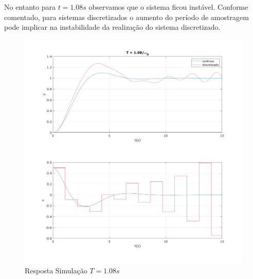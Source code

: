\documentclass[a4paper,11pt]{article}
\begin{document}
No entanto para $t=1.08s$ observamos que o sistema ficou instável. Conforme comentado, para sistemas discretizados o aumento do período de amostragem pode implicar na instabilidade da realização do sistema discretizado.

\begin{figure}[H]
    \centering
    \includegraphics[width=0.9\linewidth]{img/exsim2-plot-sim-t108.png}
    \caption{Resposta Simulação $T=1.08s$}
\end{figure}




\nocite{sympy}
\nocite{pythontex}
\nocite{matlabcontrol}
\nocite{matlabsymbolic}

\newpage
\end{document}
